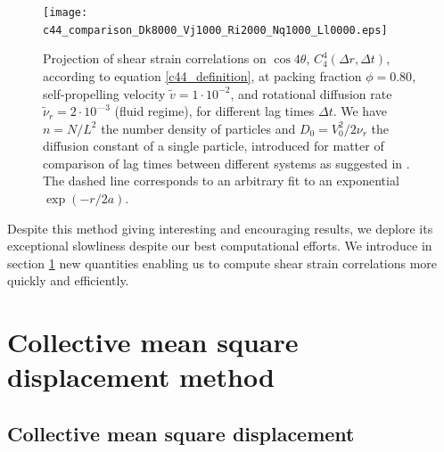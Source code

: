 \documentclass[class=report, float=false, crop=false]{standalone}
\begin{document}
\begin{figure}[H]
\centering
\texttt{[image: c44\_comparison\_Dk8000\_Vj1000\_Ri2000\_Nq1000\_Ll0000.eps]}
\caption{Projection of shear strain correlations on $\cos4\theta$, $C_4^4(\Delta r, \Delta t)$, according to equation \ref{c44_definition}, at packing fraction $\phi = 0.80$, self-propelling velocity $\tilde{v} = 1\cdot10^{-2}$, and rotational diffusion rate $\tilde{\nu}_r = 2\cdot10^{—3}$ (fluid regime), for different lag times $\Delta t$. We have $n = N/L^2$ the number density of particles and $D_0 = V_0^2/2\nu_r$ the diffusion constant of a single particle, introduced for matter of comparison of lag times between different systems as suggested in \cite{illing2016strain}. The dashed line corresponds to an arbitrary fit to an exponential $\exp(-r/2a)$.}
\label{c44_real_fluid}
\end{figure}


Despite this method giving interesting and encouraging results, we deplore its exceptional slowliness despite our best computational efforts. We introduce in section \ref{section:collective_mean_square_displacement_method} new quantities enabling us to compute shear strain correlations more quickly and efficiently.

\section{Collective mean square displacement method}
\label{section:collective_mean_square_displacement_method}

\subsection{Collective mean square displacement}
\end{document}
